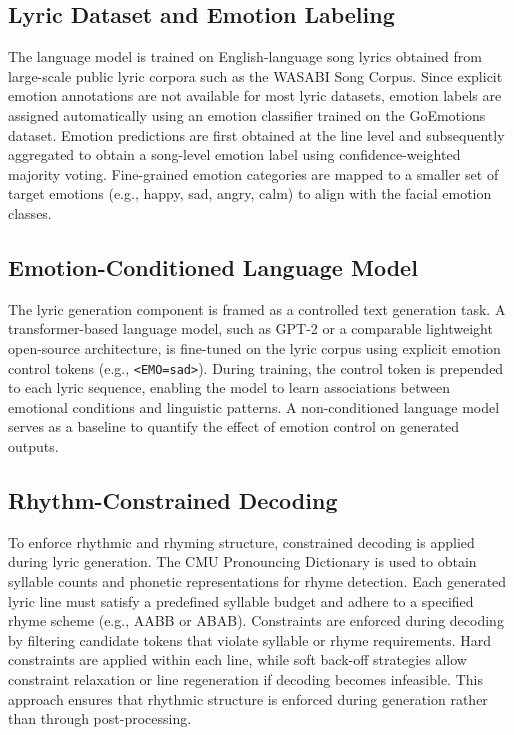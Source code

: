 \documentclass[11pt]{article}
\begin{document}
\subsection{Lyric Dataset and Emotion Labeling}

The language model is trained on English-language song lyrics obtained from large-scale public lyric corpora such as the WASABI Song Corpus. Since explicit emotion annotations are not available for most lyric datasets, emotion labels are assigned automatically using an emotion classifier trained on the GoEmotions dataset. Emotion predictions are first obtained at the line level and subsequently aggregated to obtain a song-level emotion label using confidence-weighted majority voting. Fine-grained emotion categories are mapped to a smaller set of target emotions (e.g., happy, sad, angry, calm) to align with the facial emotion classes.

\subsection{Emotion-Conditioned Language Model}

The lyric generation component is framed as a controlled text generation task. A transformer-based language model, such as GPT-2 or a comparable lightweight open-source architecture, is fine-tuned on the lyric corpus using explicit emotion control tokens (e.g., \texttt{<EMO=sad>}). During training, the control token is prepended to each lyric sequence, enabling the model to learn associations between emotional conditions and linguistic patterns. A non-conditioned language model serves as a baseline to quantify the effect of emotion control on generated outputs.

\subsection{Rhythm-Constrained Decoding}

To enforce rhythmic and rhyming structure, constrained decoding is applied during lyric generation. The CMU Pronouncing Dictionary is used to obtain syllable counts and phonetic representations for rhyme detection. Each generated lyric line must satisfy a predefined syllable budget and adhere to a specified rhyme scheme (e.g., AABB or ABAB). Constraints are enforced during decoding by filtering candidate tokens that violate syllable or rhyme requirements. Hard constraints are applied within each line, while soft back-off strategies allow constraint relaxation or line regeneration if decoding becomes infeasible. This approach ensures that rhythmic structure is enforced during generation rather than through post-processing.
\end{document}
